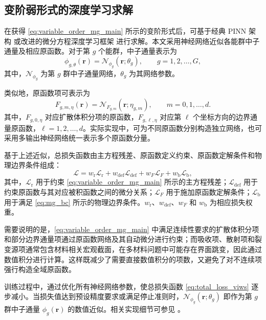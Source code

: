 \documentclass[final,3p,times,sort&compress]{elsarticle}
\begin{document}
{\color{black}
\subsection{变阶弱形式的深度学习求解}
\label{sec:nn_loss}

在获得 \cref{eq:variable_order_mg_main} 所示的变阶形式后，可基于经典 PINN 架构 \cite{raissi2019physicsinformed} 或改进的微分方程深度学习框架 \cite{lu2021deepxde, sengupta2020review, wang2024multistage} 进行求解。本文采用神经网络近似各能群中子通量及相应原函数。对于第 $g$ 个能群，中子通量表示为
\begin{equation}
    \phi_{g,\theta}(\boldsymbol r)
    =
    \mathcal{N}_{\phi_g}(\boldsymbol r;\theta_g),
    \qquad g=1,2,\ldots,G ,
    \label{eq:nn_phi_g}
\end{equation}
其中，$\mathcal{N}_{\phi_g}$ 为第 $g$ 群中子通量网络，$\theta_g$ 为其网络参数。

类似地，原函数项可表示为
\begin{equation}
    F_{g,m,\eta}(\boldsymbol r)
    =
    \mathcal{N}_{F_{g,m}}(\boldsymbol r;\eta_{g,m}),
    \qquad
    m=0,1,\ldots,d .
    \label{eq:nn_F_g}
\end{equation}
其中，$F_{g,0,\eta}$ 对应扩散体积分项的原函数，$F_{g,\ell,\eta}$ 对应第 $\ell$ 个坐标方向的边界通量原函数，$\ell=1,2,\ldots,d$。实际实现中，可为不同原函数分别构造独立网络，也可采用多输出神经网络统一表示多个原函数分量。

基于上述近似，总损失函数由主方程残差、原函数定义约束、原函数定解条件和物理边界条件组成：
\begin{equation}
    \mathcal{L}
    =
    w_{\mathrm r}\mathcal{L}_{\mathrm r}
    +
    w_{\mathrm{def}}\mathcal{L}_{\mathrm{def}}
    +
    w_F\mathcal{L}_{F}
    +
    w_{\mathrm b}\mathcal{L}_{\mathrm b},
    \label{eq:total_loss_viws}
\end{equation}
其中，$\mathcal{L}_{\mathrm r}$ 用于约束 \cref{eq:variable_order_mg_main} 所示的主方程残差；$\mathcal{L}_{\mathrm{def}}$ 用于约束原函数与其对应被积函数之间的微分关系；$\mathcal{L}_{F}$ 用于施加原函数定解条件；$\mathcal{L}_{\mathrm b}$ 用于满足 \cref{eq:mg_bc} 所示的物理边界条件。$w_{\mathrm r}$、$w_{\mathrm{def}}$、$w_F$ 和 $w_{\mathrm b}$ 为相应损失权重。

需要说明的是，\cref{eq:variable_order_mg_main} 中满足连续性要求的扩散体积分项和部分边界通量项通过原函数网络及其自动微分进行约束；而吸收项、散射项和裂变源项通常包含材料相关宏观截面，在多材料问题中可能存在界面跳变，因此通过数值积分进行计算。这样既减少了需要直接数值积分的项数，又避免了对不连续项强行构造全域原函数。

训练过程中，通过优化所有神经网络参数，使总损失函数 \cref{eq:total_loss_viws} 逐步减小。当损失值达到预设精度要求或满足停止准则时，$\mathcal{N}_{\phi_g}(\boldsymbol r;\theta_g)$ 即作为第 $g$ 群中子通量 $\phi_g(\boldsymbol r)$ 的数值近似。相关实现细节可参见 \cite{liu2025neutron, LiuDong2025DuoWeiLian}。
}
\end{document}
